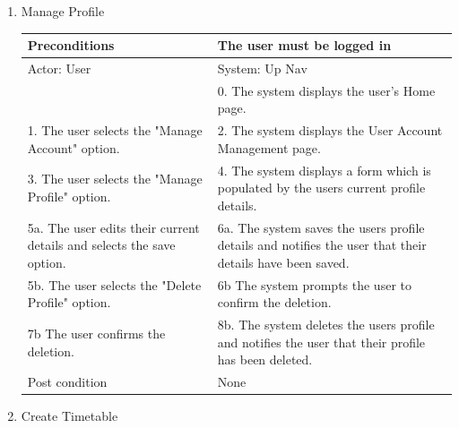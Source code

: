 \documentclass{article}
\begin{document}
\begin{center}
\begin{enumerate}
\begin{enumerate}
	\item{Manage Profile}

	\begin{table}[]
	\centering
		\begin{tabular}{ | m{15em} | m{15em}| }
		\hline
		Preconditions                                                       						& The user must be logged in \\ 				
		\hline
		Actor: User                                                       							& System: Up Nav \\ 			
		\hline
                                                                  									& 0. The system displays the user's Home page. \\                                                           
		 \hline
		1. The user selects the "Manage Account" option.						& 2. The system displays the User Account Management page. \\
		 \hline
		3. The user selects the "Manage Profile" option. 						& 4.  The system displays a form which is populated by the users current profile details. \\
		\hline
		5a. The user edits their current details and selects the save option. 			& 6a. The system saves the users profile details and notifies the user that their details have been saved. \\ 
		\hline
		5b. The user selects the "Delete Profile" option.						& 6b The system prompts the user to confirm the deletion. \\
		\hline
		7b The user confirms the deletion.								& 8b. The system deletes the users profile and notifies the user that their profile has been deleted. \\
		\hline
		Post condition                                                     						& None \\ 			
		\hline
		\end{tabular}
	\end{table}

	\item{Create Timetable}


\end{enumerate}
\end{enumerate}
\end{center}
\end{document}
